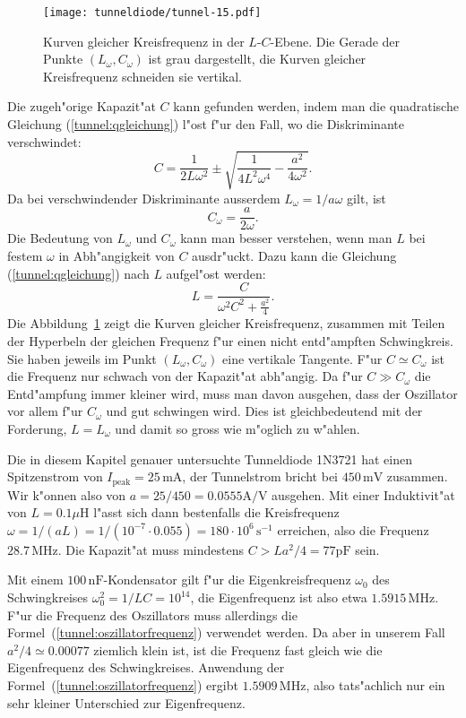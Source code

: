 \begin{figure}
\centering
\texttt{[image: tunneldiode/tunnel-15.pdf]}
\caption{Kurven gleicher Kreisfrequenz in der $L$-$C$-Ebene.
Die Gerade der Punkte $(L_\omega,C_\omega)$ ist grau dargestellt,
die Kurven gleicher Kreisfrequenz schneiden sie vertikal.
\label{tunnel:lcabhaengigkeit}}
\end{figure}

Die zugeh"orige Kapazit"at $C$ kann gefunden werden, indem man die quadratische
Gleichung (\ref{tunnel:qgleichung}) l"ost f"ur den Fall, wo die
Diskriminante verschwindet:
\[
C=\frac{1}{2L\omega^2}
\pm
\sqrt{\frac{1}{4L^2\omega^4}-\frac{a^2}{4\omega^2}}.
\]
Da bei verschwindender Diskriminante ausserdem $L_\omega=1/a\omega$ gilt, ist 
\[
C_\omega=\frac{a}{2\omega}.
\]
Die Bedeutung von $L_\omega$ und $C_\omega$ kann man besser verstehen,
wenn man $L$ bei festem $\omega$ in Abh"angigkeit von $C$ ausdr"uckt.
Dazu kann die Gleichung (\ref{tunnel:qgleichung}) nach $L$ aufgel"ost werden:
\[
L=\frac{C}{\displaystyle\omega^2C^2+\frac{a^2}4}.
\]
Die Abbildung~\ref{tunnel:lcabhaengigkeit} zeigt die Kurven gleicher
Kreisfrequenz, zusammen mit Teilen der Hyperbeln der gleichen Frequenz f"ur
einen nicht entd"ampften Schwingkreis.
Sie haben jeweils im Punkt $(L_\omega,C_\omega)$ eine vertikale Tangente.
F"ur $C\simeq C_\omega$ ist die Frequenz nur schwach von der Kapazit"at
abh"angig.
Da f"ur $C\gg C_\omega$ die Entd"ampfung immer kleiner wird, muss
man davon ausgehen, dass der Oszillator vor allem f"ur $C_\omega$
und gut schwingen wird.
Dies ist gleichbedeutend mit der Forderung, $L=L_\omega$ und damit
so gross wie m"oglich zu w"ahlen.

\begin{beispiel}
Die in diesem Kapitel genauer untersuchte Tunneldiode 1N3721 hat einen
Spitzenstrom von $I_{\text{peak}}=25\,\text{mA}$, der Tunnelstrom
bricht bei $450\,\text{mV}$ zusammen.
Wir k"onnen also von $a=25/450=0.0555\text{A/V}$ ausgehen.
Mit einer Induktivit"at von $L=0.1\mu\text{H}$ l"asst sich dann bestenfalls
die Kreisfrequenz
$\omega=1/(aL)=1/(10^{-7}\cdot 0.055)=180\cdot 10^6\,\text{s}^{-1}$
erreichen,
also die Frequenz $28.7\,\text{MHz}$.
Die Kapazit"at muss mindestens $C>La^2/4=77\text{pF}$ sein.

Mit einem $100\,\text{nF}$-Kondensator gilt f"ur die Eigenkreisfrequenz
$\omega_0$ des Schwingkreises $\omega_0^2=1/LC=10^{14}$, die Eigenfrequenz
ist also etwa $1.5915\,\text{MHz}$.
F"ur die Frequenz des Oszillators muss allerdings die
Formel~(\ref{tunnel:oszillatorfrequenz}) verwendet werden.
Da aber in unserem Fall $a^2/4\simeq 0.00077$ ziemlich klein ist, ist
die Frequenz fast gleich wie die Eigenfrequenz des Schwingkreises.
Anwendung der Formel~(\ref{tunnel:oszillatorfrequenz})
ergibt $1.5909\,\text{MHz}$, also tats"achlich nur ein sehr kleiner
Unterschied zur Eigenfrequenz.
\end{beispiel}

